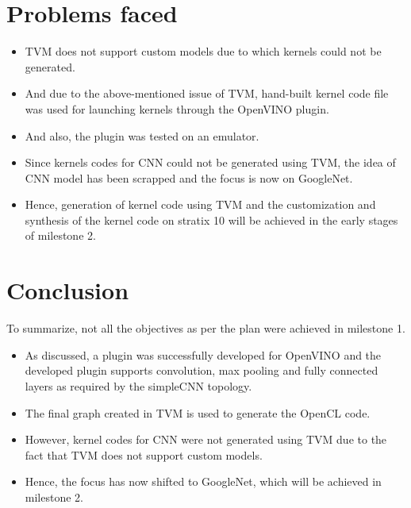 \documentclass[titlepage]{report}
\begin{document}
\chapter{Problems faced}
\begin{itemize}
    
\item TVM does not support custom models due to which kernels could not be generated.

\item And due to the above-mentioned issue of TVM, hand-built kernel code file was used for launching kernels through the OpenVINO plugin. 

\item And also, the plugin was tested on an emulator. 

\item Since kernels codes for CNN could not be generated using TVM, the idea of CNN model has been scrapped and the focus is now on GoogleNet.

\item Hence, generation of kernel code using TVM and the customization and synthesis of the kernel code on stratix 10 will be achieved in the early stages of milestone 2.

    

\end{itemize}






\chapter{Conclusion}
To summarize, not all the objectives as per the plan were achieved in milestone 1. 
\begin{itemize}
\item As discussed, a plugin was successfully developed for OpenVINO and the developed plugin supports convolution, max pooling and fully connected layers as required by the simpleCNN topology.

\item The final graph created in TVM is used to generate the OpenCL code.

\item However, kernel codes for CNN were not generated using TVM due to the fact that TVM does not support custom models.
\item Hence, the focus has now shifted to GoogleNet, which will be achieved in milestone 2.


   
\end{itemize}
\end{document}

